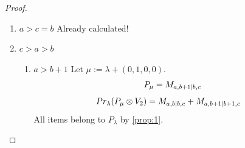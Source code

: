 \begin{proof}
\begin{enumerate}
\begin{enumerate}
  \item $c=b+1, a>c+1$
        Let $\mu:=\lambda + (0,0,1,1) $. 
\begin{equation}\notag
  \begin{aligned}
      P_{\mu} =M_{a,b|b+1,b+2}
M_{a,b+1|b,c}
  \end{aligned}
\end{equation}
\begin{equation}\notag
  \begin{aligned}
  Pr_{\lambda}(P_\mu \otimes V_3) &=
M_{a,b|b,b+1}
+M_{a,b+1|b+1,b+1}
+M_{a,b+2|b+1,b+2}
  \end{aligned}
\end{equation}
All items belong to $P_\lambda$ by \cref{prop:1}.

  \item $c=b+1, a=c+1$
        Let $\mu:=\lambda + (1,0,0,0) $. 
\begin{equation}\notag
  \begin{aligned}
      P_{\mu} =
M_{b+3,b|b,b+1}
+M_{b+3,b+1|b+1,b+1}
+M_{b+3,b+2|b+1,b+2}
M_{a,b+1|b,c}
  \end{aligned}
\end{equation}
\begin{equation}\notag
  \begin{aligned}
  Pr_{\lambda}(P_\mu \otimes V_2) &=
M_{b+2,b|b,b+1}
+M_{b+2,b+1|b+1,b+1}
+M_{b+2,b+2|b+1,b+2}
+M_{b+3,b+2|b+1,b+3}
  \end{aligned}
\end{equation}
By \cref{prop:1} and \cref{lemma:2}, all terms except $M_{b+3,b+2|b+1,b+3}$ must belong to $P_\lambda$. Since $M_{b+4,b+2|b+1,b+4}$ must appear in $P_{b+3,b+2|b+1,b+3}$ by \cref{prop:1},  the one remaining term cannot form a projective, it must also belong to $P_\lambda$.
\end{enumerate}

\item $a>c=b$ Already calculated!

\item $c>a>b$
  \begin{enumerate}
    \item $a>b+1$
        Let $\mu:=\lambda + (0,1,0,0) $. 
\begin{equation}\notag
  \begin{aligned}
      P_{\mu} =
      M_{a,b+1|b,c}
  \end{aligned}
\end{equation}
\begin{equation}\notag
  \begin{aligned}
  Pr_{\lambda}(P_\mu \otimes V_2) &=
M_{a,b|b,c}
+M_{a,b+1|b+1,c}
  \end{aligned}
\end{equation}
All items belong to $P_\lambda$ by \cref{prop:1}.


\end{enumerate}
\end{enumerate}
\end{proof}
